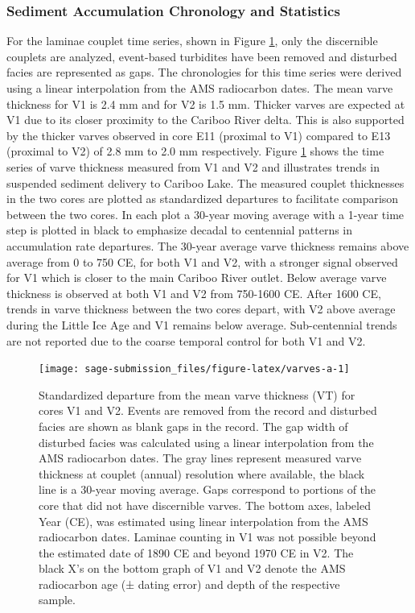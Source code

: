 \documentclass[Royal,times,doublespace,sageh]{sagej}
\begin{document}
\hypertarget{sediment-accumulation-chronology-and-statistics}{%
\subsubsection{Sediment Accumulation Chronology and
Statistics}\label{sediment-accumulation-chronology-and-statistics}}

For the laminae couplet time series, shown in Figure \ref{fig:varves-a},
only the discernible couplets are analyzed, event-based turbidites have
been removed and disturbed facies are represented as gaps. The
chronologies for this time series were derived using a linear
interpolation from the AMS radiocarbon dates. The mean varve thickness
for V1 is 2.4 mm and for V2 is 1.5 mm. Thicker varves are expected at V1
due to its closer proximity to the Cariboo River delta. This is also
supported by the thicker varves observed in core E11 (proximal to V1)
compared to E13 (proximal to V2) of 2.8 mm to 2.0 mm respectively.
Figure \ref{fig:varves-a} shows the time series of varve thickness
measured from V1 and V2 and illustrates trends in suspended sediment
delivery to Cariboo Lake. The measured couplet thicknesses in the two
cores are plotted as standardized departures to facilitate comparison
between the two cores. In each plot a 30-year moving average with a
1-year time step is plotted in black to emphasize decadal to centennial
patterns in accumulation rate departures. The 30-year average varve
thickness remains above average from 0 to 750 CE, for both V1 and V2,
with a stronger signal observed for V1 which is closer to the main
Cariboo River outlet. Below average varve thickness is observed at both
V1 and V2 from 750-1600 CE. After 1600 CE, trends in varve thickness
between the two cores depart, with V2 above average during the Little
Ice Age and V1 remains below average. Sub-centennial trends are not
reported due to the coarse temporal control for both V1 and V2.

\begin{figure}

{\centering \texttt{[image: sage-submission\_files/figure-latex/varves-a-1]} 

}

\caption{Standardized departure from the mean varve thickness (VT) for cores V1 and V2. Events are removed from the record and disturbed facies are shown as blank gaps in the record. The gap width of disturbed facies was calculated using a linear interpolation from the AMS radiocarbon dates. The gray lines represent measured varve thickness at couplet (annual) resolution where available, the black line is a 30-year moving average. Gaps correspond to portions of the core that did not have discernible varves. The bottom axes, labeled Year (CE), was estimated using linear interpolation from the AMS radiocarbon dates. Laminae counting in V1 was not possible beyond the estimated date of 1890 CE and beyond 1970 CE in V2. The black X's on the bottom graph of V1 and V2 denote the AMS radiocarbon age (± dating error) and depth of the respective sample.\label{varves-a}}\label{fig:varves-a}
\end{figure}
\end{document}
